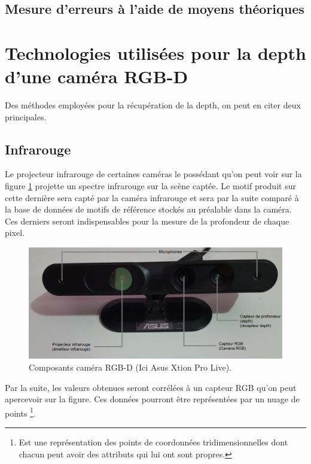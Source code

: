 \documentclass[a4paper, 12pt]{book}
\begin{document}
\subsection{Mesure d'erreurs à l'aide de moyens théoriques}

\section[Technologies utilisées pour la depth]{Technologies utilisées pour la depth d'une caméra RGB-D} 
Des méthodes employées pour la récupération de la depth, on peut en citer deux principales.
\subsection{Infrarouge}
Le projecteur infrarouge de certaines caméras le possédant qu'on peut voir sur la figure \ref{fig-Asus} projette un spectre infrarouge sur la scène captée. Le motif produit sur cette dernière sera capté par la caméra infrarouge et sera par la suite comparé à la base de données de motifs de référence stockés au préalable dans la caméra. Ces derniers seront indispensables pour la mesure de la profondeur de chaque pixel. 

\begin{figure}[htbp]
  \hspace{-0.75cm}
 \includegraphics[scale=0.50]{images/Asus.png} \hspace{2cm}
  \caption{Composants caméra RGB-D (Ici Asus Xtion Pro Live).\label{fig-Asus}}
\end{figure}

Par la suite, les valeurs obtenues seront corrélées à un capteur RGB qu'on peut apercevoir sur la figure. Ces données pourront être représentées par un nuage de points \footnote{Est une représentation des points de coordonnées tridimensionnelles dont chacun peut avoir des attributs qui lui ont sont propres.}.
\end{document}
